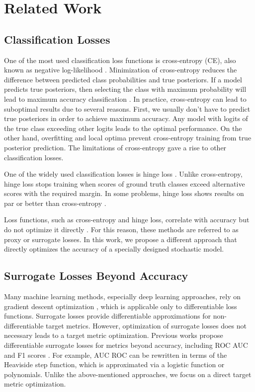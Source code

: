 \documentclass[nohyperref]{article}
\theoremstyle{plain}
\theoremstyle{definition}
\theoremstyle{remark}
\begin{document}
\section{Related Work}


\subsection{Classification Losses}
One of the most used classification loss functions is cross-entropy (CE), also known as negative log-likelihood \cite{wang2022comprehensive}. Minimization of cross-entropy reduces the difference between predicted class probabilities and true posteriors. If a model predicts true posteriors, then selecting the class with maximum probability will lead to maximum accuracy classification \cite{mitchellmax}. In practice, cross-entropy can lead to suboptimal results due to several reasons. First, we usually don't have to predict true posteriors in order to achieve maximum accuracy. Any model with logits of the true class exceeding other logits leads to the optimal performance. On the other hand, overfitting and local optima prevent cross-entropy training from true posterior prediction. The limitations of cross-entropy gave a rise to other classification losses.




One of the widely used classification losses is hinge loss \cite{gentile1998linear}.
Unlike cross-entropy, hinge loss stops training when scores of ground truth classes exceed alternative scores with the required margin. In some problems, hinge loss shows results on par or better than cross-entropy \cite{EPALLE2021107375, jin2014traffic, OZYILDIRIM2021564, peng2018discriminative}.



Loss functions, such as cross-entropy and hinge loss, correlate with accuracy but do not optimize it directly \cite{grabocka2019learning}. For this reason, these methods are referred to as proxy or surrogate losses. In this work, we propose a different approach that directly optimizes the accuracy of a specially designed stochastic model.



\subsection{Surrogate Losses Beyond Accuracy}
Many machine learning methods, especially deep learning approaches, rely on gradient descent optimization \cite{mitchellgrad}, which is applicable only to differentiable loss functions. Surrogate losses provide differentiable approximations for non-differentiable target metrics. However, optimization of surrogate losses does not necessary leads to a target metric optimization. Previous works propose differentiable surrogate losses for metrics beyond accuracy, including ROC AUC \cite{calders2007efficient, yuan2021large} and F1 scores \cite{benedict2021sigmoidf1}. For example, AUC ROC can be rewritten in terms of the Heaviside step function, which is approximated via a logistic function or polynomials. Unlike the above-mentioned approaches, we focus on a direct target metric optimization.
\end{document}
